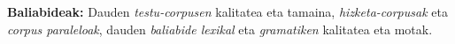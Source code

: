 \begin{multicols}{2}
\textbf{Baliabideak:} Dauden \textit{testu-corpusen} kalitatea eta tamaina, \textit{hizketa-corpusak} eta \textit{corpus paraleloak}, dauden \textit{baliabide lexikal} eta \textit{gramatiken} kalitatea eta motak.




\end{multicols}
